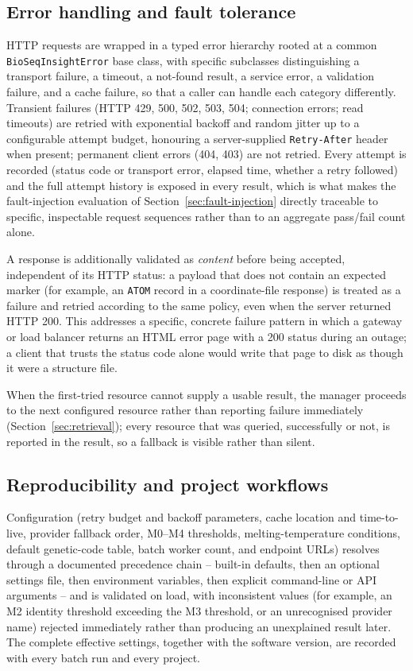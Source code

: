 \subsection{Error handling and fault tolerance}
\label{sec:fault-tolerance-methods}

HTTP requests are wrapped in a typed error hierarchy rooted at a common
\texttt{BioSeqInsightError} base class, with specific subclasses
distinguishing a transport failure, a timeout, a not-found result, a
service error, a validation failure, and a cache failure, so that a caller
can handle each category differently. Transient
failures (HTTP 429, 500, 502, 503, 504; connection errors; read timeouts)
are retried with exponential backoff and random jitter up to a configurable
attempt budget, honouring a server-supplied \texttt{Retry-After} header when
present; permanent client errors (404, 403) are not retried. Every attempt
is recorded (status code or transport error, elapsed time, whether a retry
followed) and the full attempt history is exposed in every result, which is
what makes the fault-injection evaluation of
Section~\ref{sec:fault-injection} directly traceable to specific,
inspectable request sequences rather than to an aggregate pass/fail count
alone.

A response is additionally validated as \emph{content} before being
accepted, independent of its HTTP status: a payload that does not contain an
expected marker (for example, an \texttt{ATOM} record in a coordinate-file
response) is treated as a failure and retried according to the same policy,
even when the server returned HTTP 200. This addresses a specific,
concrete failure pattern in which a gateway or load balancer returns an
HTML error page with a 200 status during an outage; a client that trusts
the status code alone would write that page to disk as though it were a
structure file.

When the first-tried resource cannot supply a usable result, the manager
proceeds to the next configured resource rather than reporting failure
immediately (Section~\ref{sec:retrieval}); every resource that was queried,
successfully or not, is reported in the result, so a fallback is visible
rather than silent.

\subsection{Reproducibility and project workflows}
\label{sec:reproducibility}

Configuration (retry budget and backoff parameters, cache location and
time-to-live, provider fallback order, M0--M4 thresholds, melting-temperature
conditions, default genetic-code table, batch worker count, and endpoint
URLs) resolves through a documented precedence chain -- built-in defaults,
then an optional settings file, then environment variables, then explicit
command-line or API arguments -- and is validated on load, with inconsistent
values (for example, an M2 identity threshold exceeding the M3 threshold, or
an unrecognised provider name) rejected immediately rather than producing an
unexplained result later. The complete effective settings, together with the
software version, are recorded with every batch run and every project.

